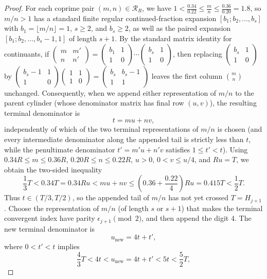 \begin{proof}
For each coprime pair $(m,n)\in\mathcal R_R$, we have
$1<\frac{0.34}{0.22}\le\frac{m}{n}\le\frac{0.36}{0.20}=1.8$, so $m/n>1$ has a
standard finite regular continued-fraction expansion $[b_1;b_2,\dots,b_s]$ with
$b_1=\lfloor m/n\rfloor=1$, $s\ge2$, and $b_s\ge2$, as well as the paired
expansion $[b_1;b_2,\dots,b_s-1,1]$ of length $s+1$. By the standard matrix
identity for continuants, if $\begin{pmatrix}m & m'\\ n & n'\end{pmatrix}
=\begin{pmatrix}b_1 & 1\\ 1 & 0\end{pmatrix}\cdots\begin{pmatrix}b_s & 1\\ 1 & 0\end{pmatrix}$,
then replacing $\begin{pmatrix}b_s & 1\\ 1 & 0\end{pmatrix}$ by
$\begin{pmatrix}b_s-1 & 1\\ 1 & 0\end{pmatrix}\begin{pmatrix}1 & 1\\ 1 & 0\end{pmatrix}
=\begin{pmatrix}b_s & b_s-1\\ 1 & 1\end{pmatrix}$ leaves the first column
$\binom{m}{n}$ unchanged. Consequently, when we append either representation of
$m/n$ to the parent cylinder (whose denominator matrix has final row $(u,v)$),
the resulting terminal denominator is
\[
t=mu+nv,
\]
independently of which of the two terminal representations of $m/n$ is chosen
(and every intermediate denominator along the appended tail is strictly less
than $t$, while the penultimate denominator $t'=m'u+n'v$ satisfies $1\le t'<t$).
Using $0.34R\le m\le0.36R$, $0.20R\le n\le0.22R$, $u>0$, $0<v\le u/4$, and
$Ru=T$, we obtain the two-sided inequality
\[
\frac13 T<0.34T=0.34Ru<mu+nv\le\left(0.36+\frac{0.22}{4}\right)Ru=0.415T<\frac12 T.
\]
Thus $t\in(T/3,T/2)$, so the appended tail of $m/n$ has not yet crossed
$T=H_{j+1}$. Choose the representation of $m/n$ (of length $s$ or $s+1$) that
makes the terminal convergent index have parity $\epsilon_{j+1}\pmod2$, and
then append the digit $4$. The new terminal denominator is
\[
u_{\mathrm{new}}=4t+t',
\]
where $0<t'<t$ implies
\[
\frac43 T<4t<u_{\mathrm{new}}=4t+t'<5t<\frac52 T,
\]
\end{proof}
